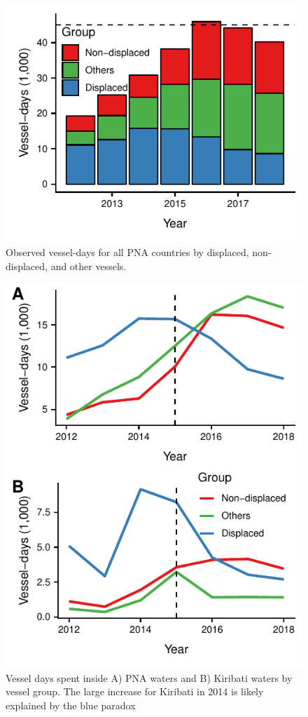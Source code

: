\documentclass[9p,twocolumn,twoside,lineno]{pnas-new}
\begin{document}
\begin{figure}[ht]
\centering
	\includegraphics{img/all_PS_VDS_year.pdf}
	\caption{\label{fig:all_PS_VDS_year}Observed vessel-days for all PNA countries by displaced, non-displaced, and other vessels.}
\end{figure}

\begin{figure}[ht]
\centering
	\includegraphics{img/included_PS_VDS_year_DiD.pdf}
	\caption{\label{fig:included_PS_VDS_year_DiD}Vessel days spent inside A) PNA waters and B) Kiribati waters by vessel group. The large increase for Kiribati in 2014 is likely explained by the blue paradox \cite{mcdermott_2018}}
\end{figure}
\end{document}

